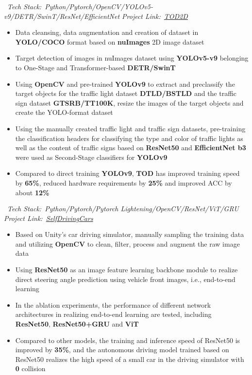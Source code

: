 \documentclass{resume}
\begin{document}
\ \textit{Tech Stack:\ Python/Pytorch/OpenCV/YOLOv5-v9/DETR/SwinT/ResNet/EfficientNet \hfill Project Link:\ \href{https://github.com/LuckyMax0722/TOD2D}{TOD2D}}
\begin{itemize}
  \item Data cleansing, data augmentation and creation of dataset in \textbf{YOLO/COCO} format based on \textbf{nuImages} 2D image dataset
  \item Target detection of images in nuImages dataset using \textbf{YOLOv5-v9} belonging to One-Stage and Transformer-based \textbf{DETR/SwinT}
  \item Using \textbf{OpenCV} and pre-trained \textbf{YOLOv9} to extract and preclassify the target objects for the traffic light dataset \textbf{DTLD/BSTLD} and the traffic sign dataset \textbf{GTSRB/TT100K}, resize the images of the target objects and create the YOLO-format dataset
  \item Using the manually created traffic light and traffic sign datasets, pre-training the classification headers for classifying  the type and color of traffic lights as well as the content of traffic signs based on \textbf{ResNet50} and \textbf{EfficientNet b3} were used as Second-Stage classifiers for \textbf{YOLOv9}
  \item Compared to direct training \textbf{YOLOv9}, \textbf{TOD} has improved training speed by \textbf{65\%}, reduced hardware requirements by \textbf{25\%} and improved ACC by about \textbf{12\%}
\end{itemize}

\ \textit{Tech Stack:\ Python/Pytorch/Pytorch Lightening/OpenCV/ResNet/ViT/GRU \hfill Project Link:\ \href{https://github.com/LuckyMax0722/SelfDrivingCars}{SelfDrivingCars}}
\begin{itemize}
  \item Based on Unity's car driving simulator, manually sampling the training data and utilizing \textbf {OpenCV} to clean, filter, process and augment the raw image data
  \item Using \textbf{ResNet50} as an image feature learning backbone module to realize direct steering angle prediction using vehicle front images, i.e., end-to-end learning
  \item In the ablation experiments, the performance of different network architectures in realizing end-to-end learning are tested, including \textbf{ResNet50}, \textbf{ResNet50+GRU} and \textbf{ViT}
  \item Compared to other models, the training and inference speed of ResNet50 is improved by \textbf{35\%}, and the autonomous driving model trained based on ResNet50 realizes the high speed of a small car in the driving simulator with \textbf{0} collision
\end{itemize}
\end{document}
